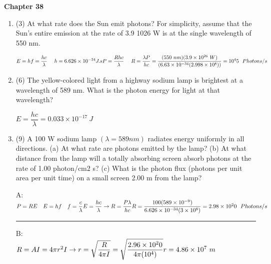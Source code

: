 \documentclass[fleqn]{article}
\begin{document}
  \textbf{Chapter 38}
  \begin{enumerate}
    \item (3) At what rate does the Sun emit photons? For simplicity, assume that the Sun’s entire emission at the rate of 3.9  1026 W is at the single wavelength of 550 nm.

      \textcolor{hwColor}{
        $
          E=hf=\dfrac{hc}{\lambda} ~~~~ h=6.626 \times 10^{-34} J.s \\
          \\
          P=\dfrac{Rhc}{\lambda} ~~~~ R=\dfrac{\lambda P}{hc}=\dfrac{(550 ~ nm)(3.9 \times 10^{26} ~ W)}{(6.63 \times 10^{-34} (2.998 \times 10^8))}=10^45 ~~ Photons/s
        $
      }

    \item (6) The yellow-colored light from a highway sodium lamp is brightest at a wavelength of 589 nm. What is the photon energy for light at that wavelength?

      \textcolor{hwColor}{
        $
          E=\dfrac{hc}{\lambda}=0.033 \times 10^{-17} ~ J
        $
      }

    \item (9) A 100 W sodium lamp $(\lambda=589 nm)$ radiates energy uniformly in all directions. (a) At what rate are photons emitted by the lamp? (b) At what distance from the lamp will a totally absorbing screen absorb photons at the rate of 1.00 photon/cm2 s? (c) What is the photon flux (photons per unit area per unit time) on a small screen 2.00 m from the lamp?

      \textcolor{hwColor}{
        A: \\
        $
          P=RE ~~~ E=hf ~~~ f=\dfrac{c}{\lambda} \\
          \\
          E=\dfrac{hc}{\lambda} \rightarrow R=\dfrac{P \lambda}{hc} \\
          R=\dfrac{100(589 \times 10^{-9})}{6.626 \times 10^{-34}(3 \times 10^8)}=2.98 \times 10^20 ~~ Photons/s
        $
      }

      \textcolor{hwColor}{   
        \rule{15cm}{0.4pt}   
      }

      \textcolor{hwColor}{
        B: \\
        $
          R=AI=4 \pi r^2 I \rightarrow r=\sqrt{\dfrac{R}{4 \pi I}}=\sqrt{\dfrac{2.96 \times 10^20}{4 \pi (10^4)}} \\
          \\
          r=4.86 \times 10^7 ~ m 
        $
      }


\end{enumerate}
\end{document}
